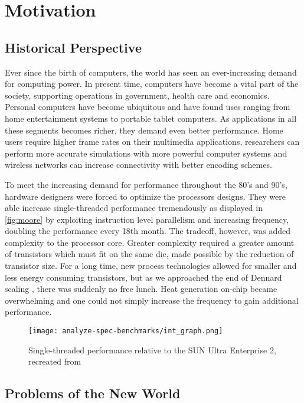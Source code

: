 
\section{Motivation}

\subsection{Historical Perspective}

Ever since the birth of computers, the world has seen an ever-increasing demand
for computing power. In present time, computers have become a vital part of the
society, supporting operations in government, health care and economics.
Personal computers have become ubiquitous and have found uses ranging from home
entertainment systems to portable tablet computers. As applications in all these
segments becomes richer, they demand even better performance. Home users require
higher frame rates on their multimedia applications, researchers can perform
more accurate simulations with more powerful computer systems and wireless
networks can increase connectivity with better encoding schemes.

To meet the increasing demand for performance throughout the 80's and 90's,
hardware designers were forced to optimize the processors designs. They were
able increase single-threaded performance tremendously as displayed in
\autoref{fig:moore} by exploiting instruction level parallelism and increasing
frequency, doubling the performance every 18th month. The tradeoff, however, was
added complexity to the processor core. Greater complexity required a greater
amount of transistors which must fit on the same die, made possible by the
reduction of transistor size. For a long time, new process technologies allowed
for smaller and less energy consuming transistors, but as we approached the end
of Dennard scaling \cite{dennard}, there was suddenly no free lunch. Heat
generation on-chip became overwhelming and one could not simply increase the
frequency to gain additional performance.

\begin{figure}
\texttt{[image: analyze-spec-benchmarks/int\_graph.png]}
\caption{Single-threaded performance relative to the SUN Ultra Enterprise 2, recreated from \cite{preshing}}
\label{fig:moore}
\end{figure}

\subsection{Problems of the New World}

